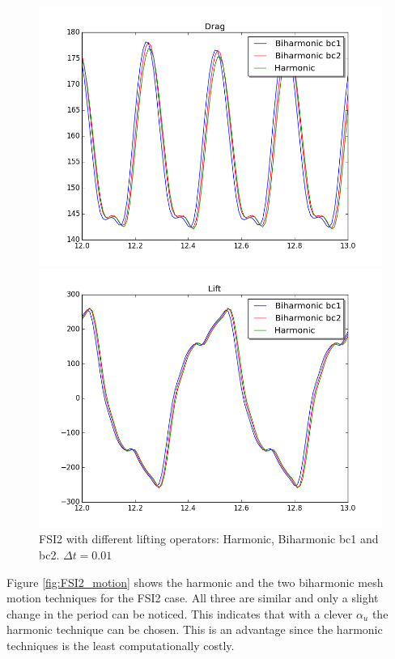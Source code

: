 \begin{figure}[H]
\begin{minipage}[b]{0.5\linewidth}
    \centering
    \includegraphics[scale=0.35]{./Verification_Validation/Mesh_motion_results/FSI2_dt001_drag.png} 
    \vspace{4ex}
  \end{minipage}%
  \begin{minipage}[b]{0.5\linewidth}
    \centering
    \includegraphics[scale=0.35]{./Verification_Validation/Mesh_motion_results/FSI2_dt001_lift.png} 
    \vspace{4ex}
  \end{minipage} 
\caption {FSI2 with different lifting operators: Harmonic, Biharmonic bc1 and bc2. $\Delta t = 0.01$}
\end{figure}

Figure \ref{fig:FSI2_motion} shows the harmonic and the two biharmonic mesh motion techniques for the FSI2 case. All three are similar and only a slight change in the period can be noticed. This indicates that with a clever $\alpha_u$ the harmonic technique can be chosen. This is an advantage since the harmonic techniques is the least computationally costly.








